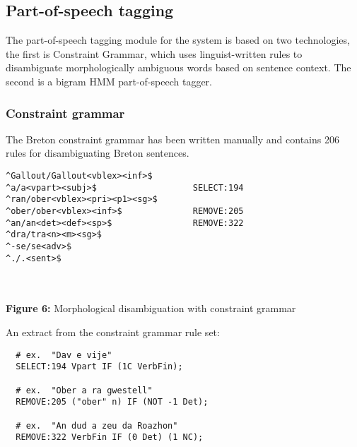 \documentclass[a0,landscape]{a0poster}
\begin{document}
\begin{multicols}{4}
\subsection{Part-of-speech tagging}

\noindent
The part-of-speech tagging module for the system is based on two technologies, the first is 
Constraint Grammar, which uses linguist-written rules to disambiguate
morphologically ambiguous words based on sentence context. The second is a
bigram HMM part-of-speech tagger.

\subsubsection{Constraint grammar}

\noindent
The Breton constraint grammar has been written manually and contains 206 rules
for disambiguating Breton sentences. \\

\begin{center}
\begin{minipage}[b]{25cm}
\begin{small}
\begin{verbatim}
^Gallout/Gallout<vblex><inf>$    
^a/a<vpart><subj>$                   SELECT:194
^ran/ober<vblex><pri><p1><sg>$ 
^ober/ober<vblex><inf>$              REMOVE:205
^an/an<det><def><sp>$                REMOVE:322
^dra/tra<n><m><sg>$ 
^-se/se<adv>$
^./.<sent>$
\end{verbatim}
\end{small}
\end{minipage}\\
~\\
\textbf{Figure 6:} Morphological disambiguation with constraint grammar
\vspace{0.5cm}
\end{center}

\noindent
An extract from the constraint grammar rule set:\\

\begin{small}
\begin{verbatim}
  # ex.  "Dav e vije"
  SELECT:194 Vpart IF (1C VerbFin);

  # ex.  "Ober a ra gwestell"
  REMOVE:205 ("ober" n) IF (NOT -1 Det);

  # ex.  "An dud a zeu da Roazhon"
  REMOVE:322 VerbFin IF (0 Det) (1 NC);
\end{verbatim}
\end{small}


\end{multicols}
\end{document}
